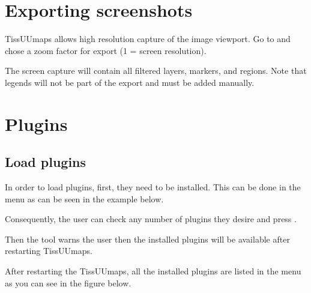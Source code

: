 \documentclass[letterpaper,10pt,english,openany,oneside]{sphinxmanual}
\begin{document}
\sphinxstepscope


\section{Exporting screenshots}
\label{\detokenize{docs/starting/capture:exporting-screenshots}}\label{\detokenize{docs/starting/capture::doc}}
\sphinxAtStartPar
TissUUmaps allows high resolution capture of the image viewport. Go to  and chose a zoom factor for export (1 = screen resolution).

\sphinxAtStartPar
The screen capture will contain all filtered layers, markers, and regions. Note that legends will not be part of the export and must be added manually.

\sphinxstepscope


\section{Plugins}
\label{\detokenize{docs/starting/plugins:plugins}}\label{\detokenize{docs/starting/plugins::doc}}

\subsection{Load plugins}
\label{\detokenize{docs/starting/plugins:load-plugins}}
\sphinxAtStartPar
In order to load plugins, first, they need to be installed. This can be done in the menu  as can be seen in the example below.

\sphinxAtStartPar
{}

\sphinxAtStartPar
Consequently, the user can check any number of plugins they desire and press .

\sphinxAtStartPar
{}

\sphinxAtStartPar
Then the tool warns the user then the installed plugins will be available after restarting TissUUmaps.

\sphinxAtStartPar
{}

\sphinxAtStartPar
After restarting the TissUUmaps, all the installed plugins are listed in the menu  as you can see in the figure below.

\sphinxAtStartPar
{}
\end{document}
